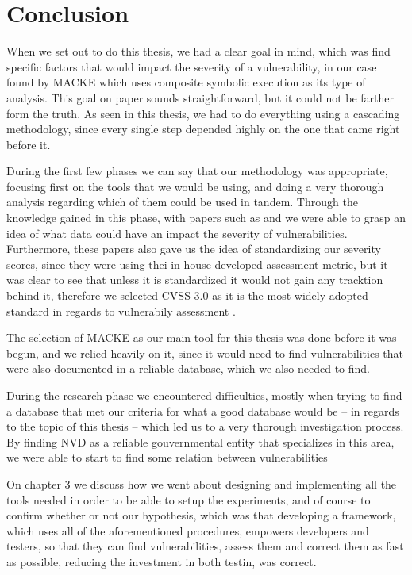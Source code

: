 
\chapter{Conclusion}\label{chapter:Conclusion}

When we set out to do this thesis, we had a clear goal in mind, which was find specific factors that would impact the severity of a vulnerability, in our case found by MACKE which uses composite symbolic execution as its type of analysis. This goal on paper sounds straightforward, but it could not be farther form the truth. As seen in this thesis, we had to do everything using a cascading methodology, since every single step depended highly on the one that came right before it.

During the first few phases we can say that our methodology was appropriate, focusing first on the tools that we would be using, and doing a very thorough analysis regarding which of them could be used in tandem. Through the knowledge gained in this phase, with papers such as \parencite{ognawala} and \parencite{thomasThesis} we were able to grasp an idea of what data could have an impact the severity of vulnerabilities. Furthermore, these papers also gave us the idea of standardizing our severity scores, since they were using thei in-house developed assessment metric, but it was clear to see that unless it is standardized it would not gain any tracktion behind it, therefore we selected CVSS 3.0 as it is the most widely adopted standard in regards to vulnerabily assessment \parencite{cvss3}.

The selection of MACKE as our main tool for this thesis was done before it was begun, and we relied heavily on it, since it would need to find vulnerabilities that were also documented in a reliable database, which we also needed to find.

During the research phase we encountered difficulties, mostly when trying to find a database that met our criteria for what a good database would be -- in regards to the topic of this thesis -- which led us to a very thorough investigation process. By finding NVD as a reliable gouvernmental entity that specializes in this area, we were able to start to find some relation between vulnerabilities

On chapter 3 we discuss how we went about designing and implementing all the tools needed in order to be able to setup the experiments, and of course to confirm whether or not our hypothesis, which was that developing a framework, which uses all of the aforementioned procedures, empowers developers and testers, so that they can find vulnerabilities, assess them and correct them as fast as possible, reducing the investment in both testin, was correct.

